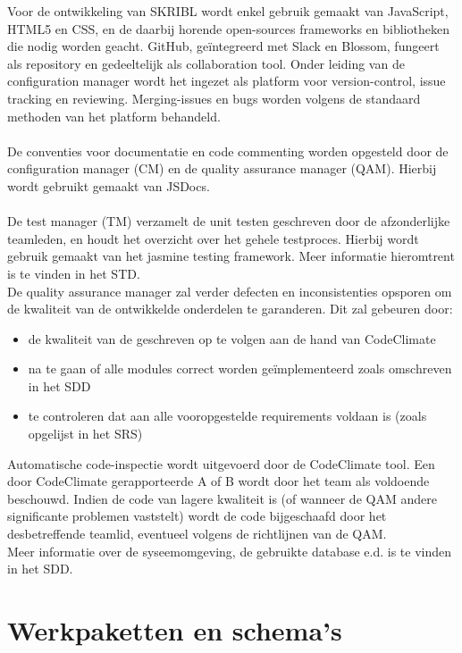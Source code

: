 \documentclass{article}
\begin{document}
Voor de ontwikkeling van SKRIBL wordt enkel gebruik gemaakt van JavaScript, HTML5 en CSS, en de daarbij horende open-sources frameworks en bibliotheken die nodig worden geacht. GitHub, ge\"{i}ntegreerd met Slack en Blossom, fungeert als repository en gedeeltelijk als collaboration tool. Onder leiding van de configuration manager wordt het ingezet als platform voor version-control, issue tracking en reviewing. Merging-issues en bugs worden volgens de standaard methoden van het platform behandeld. \\
\\
De conventies voor documentatie en code commenting worden opgesteld door de configuration manager (CM) en de quality assurance manager (QAM). Hierbij wordt gebruikt gemaakt van JSDocs. \\
\\
De test manager (TM) verzamelt de unit testen geschreven door de afzonderlijke teamleden, en houdt het overzicht over het gehele testproces. Hierbij wordt gebruik gemaakt van het jasmine testing framework. Meer informatie hieromtrent is te vinden in het STD.
\\
De quality assurance manager zal verder defecten en inconsistenties opsporen om de kwaliteit van de ontwikkelde onderdelen te garanderen. Dit zal gebeuren door:
\begin{itemize}
\item de kwaliteit van de geschreven op te volgen aan de hand van CodeClimate
\item na te gaan of alle modules correct worden ge\"{i}mplementeerd zoals omschreven in het SDD
\item te controleren dat aan alle vooropgestelde requirements voldaan is (zoals opgelijst in het SRS)
\end{itemize}
Automatische code-inspectie wordt uitgevoerd door de CodeClimate tool. Een door CodeClimate gerapporteerde  A of B wordt door het team als voldoende beschouwd. Indien de code van lagere kwaliteit is (of wanneer de QAM andere significante problemen vaststelt) wordt de code bijgeschaafd door het desbetreffende teamlid, eventueel volgens de richtlijnen van de QAM.
\\
Meer informatie over de syseemomgeving, de gebruikte database e.d. is te vinden in het SDD.



 \clearpage
\section{Werkpaketten en schema's }
\end{document}
